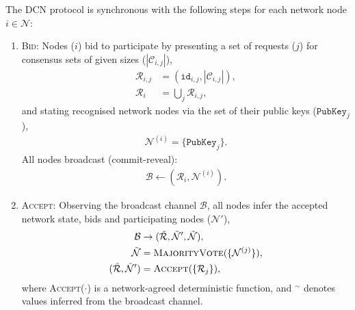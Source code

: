 The DCN protocol is synchronous with the following steps for each network node $i\in\mathcal{N}$:
\begin{enumerate}
	\item \textsc{Bid}: Nodes ($i$) bid to participate by presenting a set of requests ($j$) for consensus sets of given sizes ($|\mathcal{C}_{i,j}|$),
	      \begin{align}
		      \mathcal{R}_{i,j} & = (\mathtt{id}_{i,j},|\mathcal{C}_{i,j}|),\nonumber \\
		      \mathcal{R}_i     & = \bigcup_j \mathcal{R}_{i,j},
	      \end{align}
	      and stating recognised network nodes via the set of their public keys ($\mathtt{PubKey}_j$),
	      \begin{align}
		      \mathcal{N}^{(i)} = \{\mathtt{PubKey}_j\}.
	      \end{align}
	      All nodes broadcast (commit-reveal):
	      \begin{align}
		      \mathcal{B} \gets (\mathcal{R}_i, \mathcal{N}^{(i)}).
	      \end{align}
	\item \textsc{Accept}: Observing the broadcast channel $\mathcal{B}$, all nodes infer the accepted network state, bids and participating nodes ($\mathcal{N}'$),
	      \begin{align}
		      \mathcal{B}                                & \to (\tilde{\mathcal{R}},\tilde{\mathcal{N}}',\tilde{\mathcal{N}}),\nonumber \\
		      \tilde{\mathcal{N}}                        & = \textsc{MajorityVote}(\{\mathcal{N}^{(j)}\}),\nonumber                     \\
		      (\tilde{\mathcal{R}},\tilde{\mathcal{N}}') & = \textsc{Accept}(\{\mathcal{R}_j\}),
	      \end{align}
	      where \textsc{Accept}($\cdot$) is a network-agreed deterministic function, and ${}^\sim$ denotes values inferred from the broadcast channel.


\end{enumerate}
